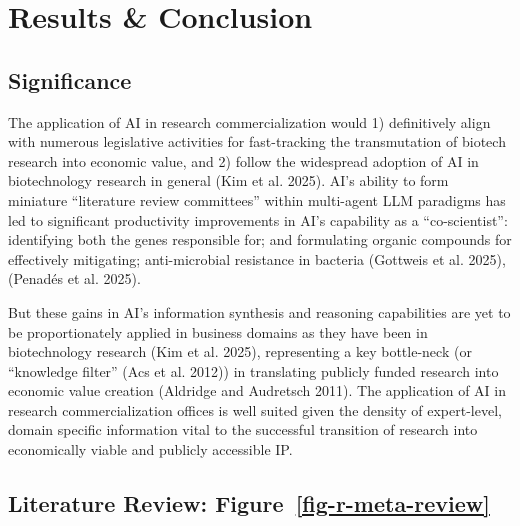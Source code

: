 \documentclass[
]{article}
\begin{document}
\section{Results \& Conclusion}\label{results-conclusion}

\subsection{Significance}\label{significance}

The application of AI in research commercialization would 1)
definitively align with numerous legislative activities for
fast-tracking the transmutation of biotech research into economic value,
and 2) follow the widespread adoption of AI in biotechnology research in
general (Kim et al. 2025). AI's ability to form miniature ``literature
review committees'' within multi-agent LLM paradigms has led to
significant productivity improvements in AI's capability as a
``co-scientist'': identifying both the genes responsible for; and
formulating organic compounds for effectively mitigating; anti-microbial
resistance in bacteria (Gottweis et al. 2025), (Penadés et al. 2025).

But these gains in AI's information synthesis and reasoning capabilities
are yet to be proportionately applied in business domains as they have
been in biotechnology research (Kim et al. 2025), representing a key
bottle-neck (or ``knowledge filter'' (Acs et al. 2012)) in translating
publicly funded research into economic value creation (Aldridge and
Audretsch 2011). The application of AI in research commercialization
offices is well suited given the density of expert-level, domain
specific information vital to the successful transition of research into
economically viable and publicly accessible IP.

\subsection{\texorpdfstring{Literature Review:
Figure~\ref{fig-r-meta-review}}{Literature Review: Figure~}}\label{sec-r-lit-review}
\end{document}
